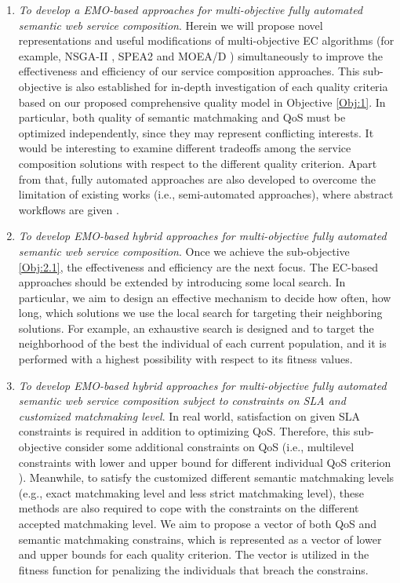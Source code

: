 \begin{enumerate}
\begin{enumerate}
    \item \label{Obj:2.1} \emph{To develop a EMO-based approaches for multi-objective fully automated semantic web service composition}. Herein we will propose novel representations and useful modifications of multi-objective EC algorithms (for example, NSGA-II \cite{deb2002fast}, SPEA2 \cite{zitzler2001spea2} and MOEA/D \cite{zhang2007moea}) simultaneously to improve the effectiveness and efficiency of our service composition approaches. This sub-objective is also established for in-depth investigation of each quality criteria based on our proposed comprehensive quality model in Objective \ref{Obj:1}.  In particular, both quality of semantic matchmaking and QoS must be optimized independently, since they may represent conflicting interests. It would be interesting to examine different tradeoffs among the service composition solutions with respect to the different quality criterion. Apart from that, fully automated approaches are also developed to overcome the limitation of existing works (i.e., semi-automated approaches), where abstract workflows are given .
   
    \item \emph{To develop EMO-based hybrid approaches for multi-objective fully automated semantic web service composition}. Once we achieve the sub-objective \ref{Obj:2.1}, the effectiveness and efficiency are the next focus. The EC-based approaches should be extended by introducing some local search. In particular, we aim to design an effective mechanism to decide how often, how long, which solutions we use the local search for targeting their neighboring solutions. For example, an exhaustive search is designed and to target the neighborhood of the best the individual of each current population, and it is performed with a highest possibility with respect to its fitness values. 

    \item \emph{To develop EMO-based hybrid approaches for multi-objective fully automated semantic web service composition subject to constraints on SLA and customized matchmaking level}. In real world, satisfaction on given SLA constraints is required in addition to optimizing QoS. Therefore, this sub-objective consider some additional constraints on  QoS (i.e., multilevel constraints with lower and upper bound for different individual QoS criterion \cite{yin2014hybrid}). Meanwhile, to satisfy the customized different semantic matchmaking levels (e.g., exact matchmaking level and less strict matchmaking level), these methods are also required to cope with the constraints on the different accepted matchmaking level. We aim to propose a vector of both QoS and semantic matchmaking constrains, which is represented as a vector of lower and upper bounds for each quality criterion. The vector is utilized in the fitness function for penalizing the individuals that breach the constrains. 
   \end{enumerate}
   

\end{enumerate}
